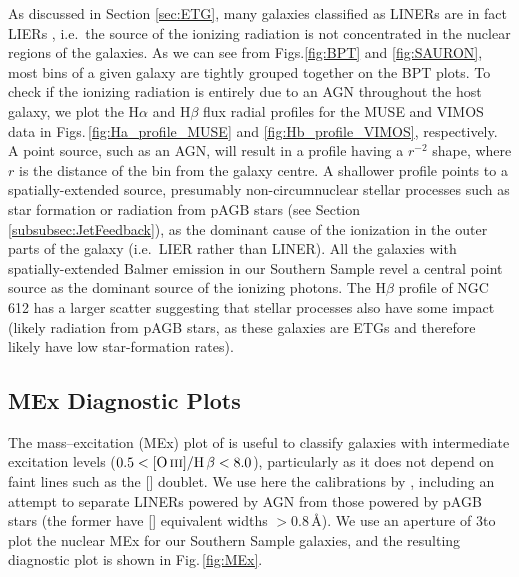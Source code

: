 		As discussed in Section \ref{sec:ETG}, many galaxies classified as LINERs are in fact LIERs \citep[see e.g.][]{Sarzi2005, Sarzi2010, Singh2013, Belfiore2016}, i.e.\ the source of the ionizing radiation is not concentrated in the nuclear regions of the galaxies. As we can see from Figs.\ref{fig:BPT} and \ref{fig:SAURON}, most bins of a given galaxy are tightly grouped together on the BPT plots. To check if the ionizing radiation is entirely due to an AGN throughout the host galaxy, we plot the H$\alpha$ and H$\beta$ flux radial profiles for the MUSE and VIMOS data in Figs.\,\ref{fig:Ha_profile_MUSE} and \ref{fig:Hb_profile_VIMOS}, respectively. A point source, such as an AGN, will result in a profile having a $r^{-2}$ shape, where $r$ is the distance of the bin from the galaxy centre. A shallower profile points to a spatially-extended source, presumably non-circumnuclear stellar processes such as star formation or radiation from pAGB stars (see Section \ref{subsubsec:JetFeedback}), as the dominant cause of the ionization in the outer parts of the galaxy (i.e.\ LIER rather than LINER). All the galaxies with spatially-extended Balmer emission in our Southern Sample revel a central point source as the dominant source of the ionizing photons. The H$\beta$ profile of NGC 612 has a larger scatter suggesting that stellar processes also have some impact (likely radiation from pAGB stars, as these galaxies are ETGs and therefore likely have low star-formation rates).

		


	\subsection{MEx Diagnostic Plots}
		\label{subsec:MEx}
		The mass--excitation (MEx) plot of \citet{Juneau2011} is useful to classify galaxies with intermediate excitation levels ($0.5 < \mathrm{[\ion{O}{iii}]/H\,\beta} < 8.0$), particularly as it does not depend on faint lines such as the [] doublet. We use here the calibrations by \citet{Nyland2016}, including an attempt to separate LINERs powered by AGN from those powered by pAGB stars (the former have [] equivalent widths $>0.8$\,\AA). We use an aperture of 3\arcsec to plot the nuclear MEx for our Southern Sample galaxies, and the resulting diagnostic plot is shown in Fig.\,\ref{fig:MEx}. 


